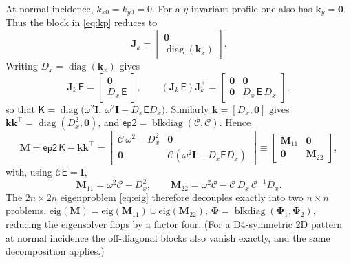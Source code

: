 \documentclass[11pt]{article}
\theoremstyle{remark}
\newcommand{\Cmat}{\mathcal{C}}
\newcommand{\kp}{\mathsf{K}}
\newcommand{\epinv}{\mathsf{E}}
\newcommand{\Jk}{\mathbf{J}_k}
\newcommand{\kk}{\mathbf{k}}
\newcommand{\Ph}{\mathbf{\Phi}}
\newcommand{\Id}{\mathbf{I}}
\DeclareMathOperator{\diag}{diag}
\DeclareMathOperator{\blkdiag}{blkdiag}
\begin{document}
At normal incidence, $k_{x0}=k_{y0}=0$.  For a $y$-invariant profile one also
has $\kk_y=\mathbf{0}$.  Thus the block in \eqref{eq:kp} reduces to
\begin{equation*}
\Jk=\begin{bmatrix}\mathbf{0}\\ \diag(\kk_x)\end{bmatrix}.
\end{equation*}
Writing $D_x=\diag(\kk_x)$ gives
\begin{equation}
\Jk\,\epinv=
\begin{bmatrix}\mathbf{0}\\ D_x\,\epinv\end{bmatrix},\qquad
(\Jk\,\epinv)\Jk^{\top}=
\begin{bmatrix}\mathbf{0}&\mathbf{0}\\
\mathbf{0}&D_x\,\epinv\,D_x\end{bmatrix},
\end{equation}
so that $\kp=\diag\big(\omega^2\Id,\ \omega^2\Id-D_x\epinv D_x\big)$.
Similarly $\kk=[D_x;\mathbf{0}]$ gives
$\kk\kk^{\top}=\diag(D_x^2,\mathbf{0})$, and $\mathsf{ep2}=\blkdiag(\Cmat,\Cmat)$.
Hence
\begin{equation}
\mathbf{M}=\mathsf{ep2}\,\kp-\kk\kk^{\top}
=\begin{bmatrix}
\Cmat\,\omega^2-D_x^2 & \mathbf{0}\\
\mathbf{0} & \Cmat(\omega^2\Id-D_x\epinv D_x)
\end{bmatrix}
\equiv
\begin{bmatrix}\mathbf{M}_{11}&\mathbf{0}\\
\mathbf{0}&\mathbf{M}_{22}\end{bmatrix},
\label{eq:Mbd}
\end{equation}
with, using $\Cmat\epinv=\Id$,
\begin{equation}
\mathbf{M}_{11}=\omega^2\Cmat-D_x^2,\qquad
\mathbf{M}_{22}=\omega^2\Cmat-\Cmat\,D_x\,\Cmat^{-1}D_x.
\label{eq:bdblocks}
\end{equation}
The $2n\times2n$ eigenproblem \eqref{eq:eig} therefore decouples exactly into
two $n\times n$ problems,
$\mathrm{eig}(\mathbf{M})=\mathrm{eig}(\mathbf{M}_{11})\cup\mathrm{eig}(\mathbf{M}_{22})$,
$\Ph=\blkdiag(\Ph_1,\Ph_2)$, reducing the eigensolver flops by a factor four.
(For a D4-symmetric 2D pattern at normal incidence the off-diagonal blocks also
vanish exactly, and the same decomposition applies.)
\end{document}
